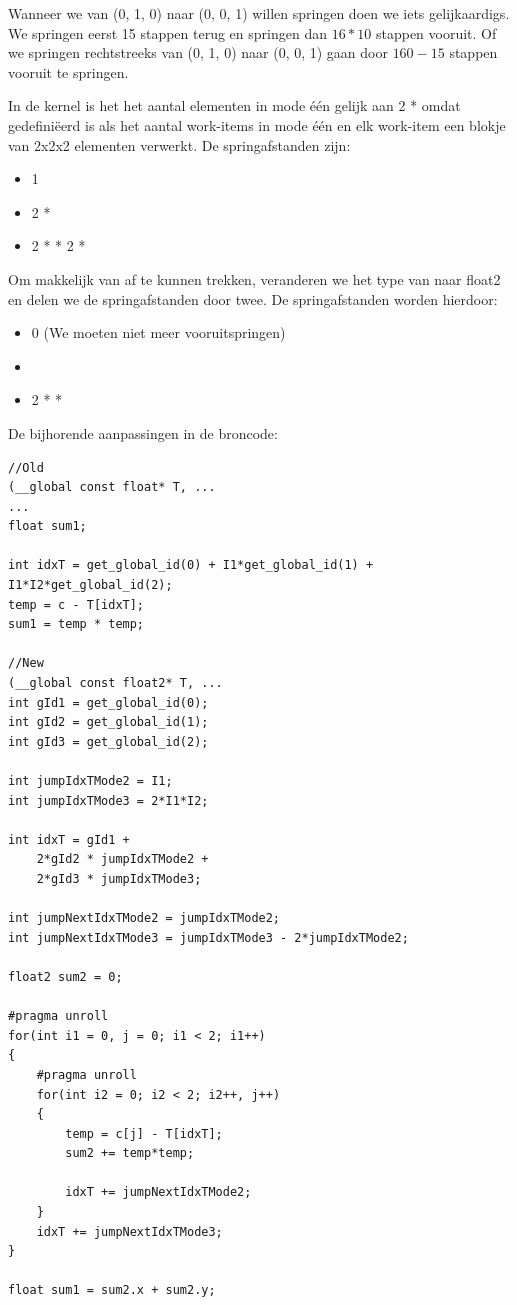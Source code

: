 Wanneer we van (0, 1, 0) naar (0, 0, 1) willen springen doen we iets gelijkaardigs. We springen eerst 15 stappen terug en springen dan $16 * 10$ stappen vooruit. Of we springen rechtstreeks van (0, 1, 0) naar (0, 0, 1) gaan door $160 - 15$ stappen vooruit te springen.

In de kernel is het het aantal elementen in mode \'e\'en gelijk aan 2 *  omdat  gedefini\"eerd is als het aantal work-items in mode \'e\'en en elk work-item een blokje van 2x2x2 elementen verwerkt. De springafstanden zijn:
\begin{itemize}
    \item 1
    \item 2 * 
    \item 2 *  * 2 * 
\end{itemize}
Om \TT makkelijk van \CC af te kunnen trekken, veranderen we het type van \TT naar float2 en delen we de springafstanden door twee. De springafstanden worden hierdoor:
\begin{itemize}
	\item 0 (We moeten niet meer vooruitspringen)
    \item {}
    \item 2 *  * 
\end{itemize}

De bijhorende aanpassingen in de broncode:
\begin{lstlisting}
//Old
(__global const float* T, ...
...
float sum1;

int idxT = get_global_id(0) + I1*get_global_id(1) + I1*I2*get_global_id(2);
temp = c - T[idxT];
sum1 = temp * temp;

//New
(__global const float2* T, ...
int gId1 = get_global_id(0);
int gId2 = get_global_id(1);
int gId3 = get_global_id(2);

int jumpIdxTMode2 = I1;
int jumpIdxTMode3 = 2*I1*I2;

int idxT = gId1 + 
	2*gId2 * jumpIdxTMode2 +
	2*gId3 * jumpIdxTMode3;

int jumpNextIdxTMode2 = jumpIdxTMode2;
int jumpNextIdxTMode3 = jumpIdxTMode3 - 2*jumpIdxTMode2;

float2 sum2 = 0;

#pragma unroll
for(int i1 = 0, j = 0; i1 < 2; i1++)
{
	#pragma unroll
	for(int i2 = 0; i2 < 2; i2++, j++)
	{
		temp = c[j] - T[idxT];
		sum2 += temp*temp;
		
		idxT += jumpNextIdxTMode2;
	}
	idxT += jumpNextIdxTMode3;
}

float sum1 = sum2.x + sum2.y;
\end{lstlisting}


